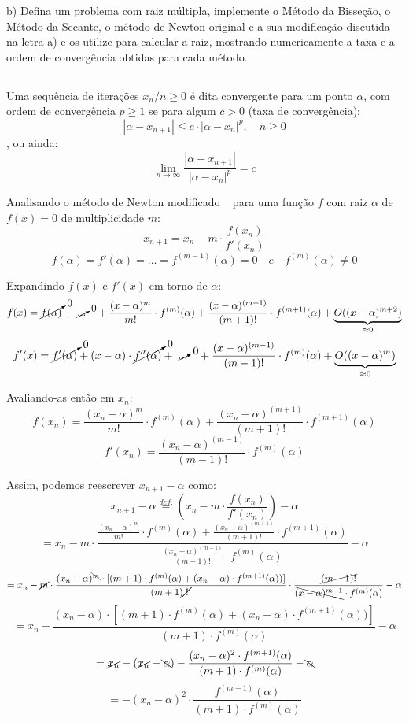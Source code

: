\documentclass[12pt,a4paper,final]{article}
\begin{document}
b)  Defina um problema com raiz múltipla, implemente o Método da Bisseção, o Método da Secante,
o método de Newton original e a sua modificação discutida na letra a) e os utilize para calcular a
raiz, mostrando numericamente a taxa e a ordem de convergência obtidas para cada método.

\subsection{}


Uma sequência de iterações $ {x_n / n \geq 0} $ é dita convergente para um ponto $ \alpha $, com
ordem de convergência $ p \geq 1 $ se para algum $ c > 0 $ (taxa de convergência):
\[ |\alpha - x_{n+1}| \leq c \cdot |\alpha - x_n|^p, \quad n \geq 0 \],
ou ainda:
\[ \lim_{n \to \infty} \frac{|\alpha - x_{n+1}|}{|\alpha - x_n|^p} = c \]

Analisando o método de Newton modificado ~\cite[p.~101]{ruggiero} para uma função $ f $ com raiz $ \alpha $ de $ f(x) = 0 $
de multiplicidade $ m $:
\[ x_{n+1} = x_n - m \cdot \frac{f(x_n)}{f'(x_n)} \]
\[ f(\alpha) = f'(\alpha) = ... = f^{(m-1)}(\alpha) = 0 \quad e \quad f^{(m)}(\alpha) \neq 0 \]

Expandindo $ f(x) $ e $ f'(x) $ em torno de $ \alpha $:
\[ f(x) = \cancelto{0}{f(\alpha)} +
          \; \cancelto{0}{ ... } \quad +
          \frac{(x - \alpha)^m}{m!} \cdot f^{(m)}(\alpha) +
          \frac{(x - \alpha)^{(m+1)}}{(m+1)!} \cdot f^{(m+1)}(\alpha) +
          \underbrace{O((x - \alpha)^{m+2})}_{\approx 0} \]
\[ f'(x) = \cancelto{0}{f'(\alpha)} +
           (x - \alpha) \cdot \cancelto{0}{f''(\alpha)} +
           \; \cancelto{0}{ ... } \quad +
           \frac{(x - \alpha)^{(m-1)}}{(m-1)!} \cdot f^{(m)}(\alpha) +
           \underbrace{O((x - \alpha)^{m})}_{\approx 0} \]

Avaliando-as então em $ x_n $:
\[ f(x_n) = \frac{(x_n - \alpha)^m}{m!} \cdot f^{(m)}(\alpha) +
            \frac{(x_n - \alpha)^{(m+1)}}{(m+1)!} \cdot f^{(m+1)}(\alpha) \]
\[ f'(x_n) = \frac{(x_n - \alpha)^{(m-1)}}{(m-1)!} \cdot f^{(m)}(\alpha) \]

Assim, podemos reescrever $ x_{n+1} - \alpha $ como:
\[ x_{n+1} - \alpha \overset{def.}{=} (x_n - m \cdot \frac{f(x_n)}{f'(x_n)}) - \alpha\]
\[ = x_n - m \cdot
     \frac{\frac{(x_n - \alpha)^m}{m!} \cdot f^{(m)}(\alpha) +
            \frac{(x_n - \alpha)^{(m+1)}}{(m+1)!} \cdot f^{(m+1)}(\alpha)}
          {\frac{(x_n - \alpha)^{(m-1)}}{(m-1)!} \cdot f^{(m)}(\alpha)} - \alpha\]
\[ = x_n - \cancel{m} \cdot \frac{(x_n - \alpha)^{\bcancel{m}} \cdot
     [(m+1) \cdot f^{(m)}(\alpha) + (x_n - \alpha) \cdot f^{(m+1)}(\alpha))]}
     {(m+1)\cancel{\; ! \;}} \cdot \frac{\cancel{(m-1)!}}{\bcancel{(x - \alpha)^{m-1}}
     \cdot f^{(m)}(\alpha)} - \alpha\]
\[ = x_n - \frac{(x_n - \alpha) \cdot [(m+1) \cdot f^{(m)}(\alpha) + (x_n - \alpha)
     \cdot f^{(m+1)}(\alpha))]}{(m+1) \cdot f^{(m)}(\alpha)} - \alpha\]
\[ = \cancel{x_n} - (\cancel{x_n} - \bcancel{\alpha}) - \frac{(x_n - \alpha)^2 \cdot f^{(m+1)}(\alpha)}
     {(m+1) \cdot f^{(m)}(\alpha)} - \bcancel{\alpha}\]
\[ = - (x_n - \alpha)^2 \cdot \frac{f^{(m+1)}(\alpha)}{(m+1) \cdot f^{(m)}(\alpha)}\]
\end{document}
